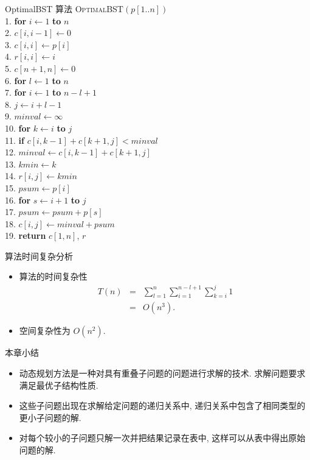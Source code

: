 \documentclass[fontset=fandol,UTF8,fleqn]{beamer}
\begin{document}
\begin{frame}{OptimalBST 算法}
\textsc{OptimalBST}$(p[1..n])$\\
1. \textbf{for} $i\gets 1$ \textbf{to} $n$ \\
2. \qquad $c[i,i-1]\gets 0$\\
3. \qquad $c[i,i]\gets p[i]$\\
4. \qquad $r[i,i]\gets i$\\
5. $c[n+1,n]\gets 0$\\
6. \textbf{for} $l\gets 1$ \textbf{to} $n$ \\
7. \qquad \textbf{for} $i\gets 1$ \textbf{to} $n-l+1$ \\
8. \qquad  \qquad $j\gets i+l-1$\\
9. \qquad  \qquad $minval\gets \infty$\\
10. \qquad  \textbf{for} $k\gets i$ \textbf{to} $j$ \\
11. \qquad  \qquad \textbf{if} $c[i,k-1]+c[k+1,j] < minval$\\
12. \qquad  \qquad \qquad $minval\gets c[i,k-1]+c[k+1,j]$\\
13. \qquad  \qquad \qquad $kmin\gets k$\\
14. \qquad   \qquad $r[i,j]\gets kmin$\\
15. \qquad   \qquad $psum\gets p[i]$\\
16. \qquad   \qquad \textbf{for} $s\gets i+1$ \textbf{to} $j$ \\
17. \qquad   \qquad \qquad $psum\gets psum+p[s]$\\
18. \qquad   \qquad $c[i,j]\gets minval+psum$\\
19. \textbf{return} $c[1,n]$, $r$
\end{frame}

\begin{frame}{算法时间复杂分析}
\begin{itemize}
\item 算法的时间复杂性
  \begin{eqnarray*}
   T(n) & = & \sum_{l=1}^{n}\sum_{i=1}^{n-l+1}\sum_{k=i}^{j}1    \\
          & = & O(n^3). 
  \end{eqnarray*}
      \item 空间复杂性为 $O(n^2)$. 
\end{itemize}
\end{frame}

\begin{frame}{本章小结}
\begin{itemize}
\item 动态规划方法是一种对具有重叠子问题的问题进行求解的技术. 求解问题要求满足最优子结构性质.
\item 这些子问题出现在求解给定问题的递归关系中, 递归关系中包含了相同类型的更小子问题的解.
\item 对每个较小的子问题只解一次并把结果记录在表中, 这样可以从表中得出原始问题的解.
\end{itemize}
\end{frame}
\end{document}
